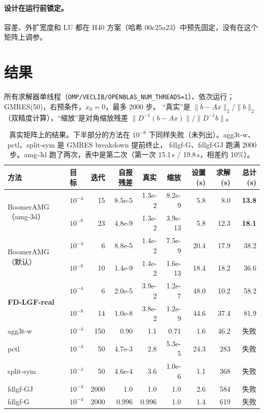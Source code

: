 \documentclass[11pt,a4paper]{ctexart}
\begin{document}
\paragraph{设计在运行前锁定。}容差、外扩宽度和 LU 都在 H40 方案（哈希 00c25a23）中预先固定，没有在这个矩阵上调参。

\section{结果}
所有求解器单线程（\texttt{OMP/VECLIB/OPENBLAS\_NUM\_THREADS=1}）、依次运行；GMRES(50)，右预条件，$x_0=0$，最多 2000 步。
“真实”是 $\|b-Ax\|_2/\|b\|_2$（双精度计算），“缩放”是对角缩放残差 $\|D^{-1}(b-Ax)\|/\|D^{-1}b\|$。

\begin{table}[H]
\centering
\small
\begin{tabular}{llrrrrrrr}
\toprule
方法 & 目标 & 迭代 & 自报残差 & 真实 & 缩放 & 设置 (s) & 求解 (s) & 总计 (s) \\
\midrule
\multirow{2}{*}{BoomerAMG（amg-3d）} & $10^{-4}$ & 15 & 8.5e-5 & 1.3e-2 & 8.2e-9 & 5.8 & 8.0 & \textbf{13.8} \\
 & $10^{-8}$ & 23 & 4.8e-9 & 1.3e-2 & 3.9e-13 & 5.8 & 12.3 & \textbf{18.1} \\
\multirow{2}{*}{BoomerAMG（默认）} & $10^{-4}$ & 6 & 8.8e-5 & 1.4e-2 & 7.5e-9 & 20.4 & 17.9 & 38.2 \\
 & $10^{-8}$ & 10 & 1.4e-9 & 1.4e-2 & 1.6e-13 & 18.4 & 18.2 & 36.6 \\
\multirow{2}{*}{\textbf{FD-LGF-real}} & $10^{-4}$ & 6 & 2.0e-5 & 3.9e-2 & 1.2e-7 & 48.0 & 10.2 & 58.2 \\
 & $10^{-8}$ & 14 & 1.0e-8 & 3.8e-2 & 1.2e-9 & 44.6 & 37.4 & 81.9 \\
\midrule
agg3t-w & $10^{-4}$ & 150 & 0.90 & 1.1 & 0.71 & 1.6 & 46.2 & 失败 \\
pctl & $10^{-4}$ & 50 & 4.7e-3 & 2.8 & 5.3e-5 & 24.3 & 283 & 失败 \\
split-sym & $10^{-4}$ & 50 & 4.6e-4 & 3.6 & 1.0e-6 & 1.1 & 368 & 失败 \\
fdlgf-GJ & $10^{-4}$ & 2000 & 1.0 & 1.0 & 1.0 & 2.6 & 584 & 失败 \\
fdlgf-G & $10^{-4}$ & 2000 & 0.996 & 0.996 & 1.0 & 1.4 & 619 & 失败 \\
\bottomrule
\end{tabular}
\caption{真实矩阵上的结果。下半部分的方法在 $10^{-8}$ 下同样失败（未列出）。agg3t-w、pctl、split-sym 是 GMRES breakdown 提前终止，
fdlgf-G、fdlgf-GJ 跑满 2000 步。amg-3d 跑了两次，表中是第二次（第一次 15.1\,s / 19.8\,s，相差约 10\%）。}
\label{tab:results}
\end{table}
\end{document}
